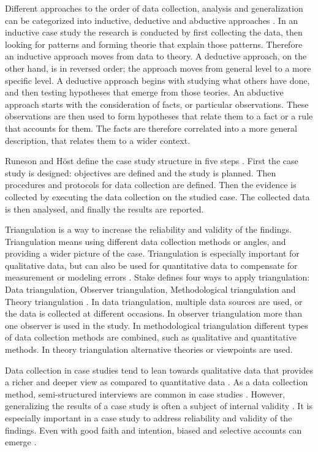 \documentclass[english, grading]{tktltiki2}
\theoremstyle{definition}
\theoremstyle{remark}
\begin{document}
Different approaches to the order of data collection, analysis and generalization can be categorized into inductive, deductive and abductive approaches \cite{dubois2002systematic}. In an inductive case study the research is conducted by first collecting the data, then looking for patterns and forming theorie that explain those patterns. Therefore an inductive approach moves from data to theory. A deductive approach, on the other hand, is in reversed order; the approach moves from general level to a more specific level. A deductive approach begins with studying what others have done, and then testing hypotheses that emerge from those teories. An abductive approach starts with the consideration of facts, or particular observations. These observations are then used to form hypotheses that relate them to a fact or a rule that accounts for them. The facts are therefore correlated into a more general description, that relates them to a wider context.

Runeson and Höst define the case study structure in five steps \cite{runeson2009guidelines}. First the case study is designed: objectives are defined and the study is planned. Then procedures and protocols for data collection are defined. Then the evidence is collected by executing the data collection on the studied case. The collected data is then analysed, and finally the results are reported.

Triangulation is a way to increase the reliability and validity of the findings. Triangulation means using different data collection methods or angles, and providing a wider picture of the case. Triangulation is especially important for qualitative data, but can also be used for quantitative data to compensate for measurement or modeling errors \cite{runeson2009guidelines}. Stake defines four ways to apply triangulation: Data triangulation, Observer triangulation, Methodological triangulation and Theory triangulation \cite{stake1995art}. In data triangulation, multiple data sources are used, or the data is collected at different occasions. In observer triangulation more than one observer is used in the study. In methodological triangulation different types of data collection methods are combined, such as qualitative and quantitative methods. In theory triangulation alternative theories or viewpoints are used.

Data collection in case studies tend to lean towards qualitative data that provides a richer and deeper view as compared to quantitative data \cite{runeson2009guidelines}. As a data collection method, semi-structured interviews are common in case studies \cite{runeson2009guidelines}. However, generalizing the results of a case study is often a subject of internal validity \cite{kitchenham2002preliminary}. It is especially important in a case study to address reliability and validity of the findings. Even with good faith and intention, biased and selective accounts can emerge \cite{robson2002real}. 
\end{document}
